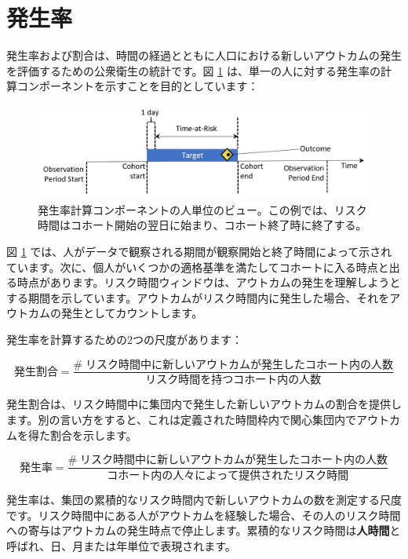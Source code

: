 \documentclass[
  11pt]{book}
\theoremstyle{definition}
\theoremstyle{definition}
\theoremstyle{definition}
\theoremstyle{definition}
\theoremstyle{remark}
\begin{document}
\section{発生率}\label{ux767aux751fux7387}

発生率および割合は、時間の経過とともに人口における新しいアウトカムの発生を評価するための公衆衛生の統計です。図 \ref{fig:incidenceTimeline} は、単一の人に対する発生率の計算コンポーネントを示すことを目的としています： 

\begin{figure}

{\centering \includegraphics[width=1\linewidth]{images/Characterization/incidenceTimeline} 

}

\caption{発生率計算コンポーネントの人単位のビュー。この例では、リスク時間はコホート開始の翌日に始まり、コホート終了時に終了する。}\label{fig:incidenceTimeline}
\end{figure}

図 \ref{fig:incidenceTimeline} では、人がデータで観察される期間が観察開始と終了時間によって示されています。次に、個人がいくつかの適格基準を満たしてコホートに入る時点と出る時点があります。リスク時間ウィンドウは、アウトカムの発生を理解しようとする期間を示しています。アウトカムがリスク時間内に発生した場合、それをアウトカムの発生としてカウントします。

発生率を計算するための2つの尺度があります：

\[
発生割合 = \frac{\#\;リスク時間中に新しいアウトカムが発生したコホート内の人数}{リスク時間を持つコホート内の人数}
\]

発生割合は、リスク時間中に集団内で発生した新しいアウトカムの割合を提供します。別の言い方をすると、これは定義された時間枠内で関心集団内でアウトカムを得た割合を示します。

\[
発生率 = \frac{\#\;リスク時間中に新しいアウトカムが発生したコホート内の人数}{コホート内の人々によって提供されたリスク時間}
\]

発生率は、集団の累積的なリスク時間内で新しいアウトカムの数を測定する尺度です。リスク時間中にある人がアウトカムを経験した場合、その人のリスク時間への寄与はアウトカムの発生時点で停止します。累積的なリスク時間は\textbf{人時間}と呼ばれ、日、月または年単位で表現されます。 
\end{document}
